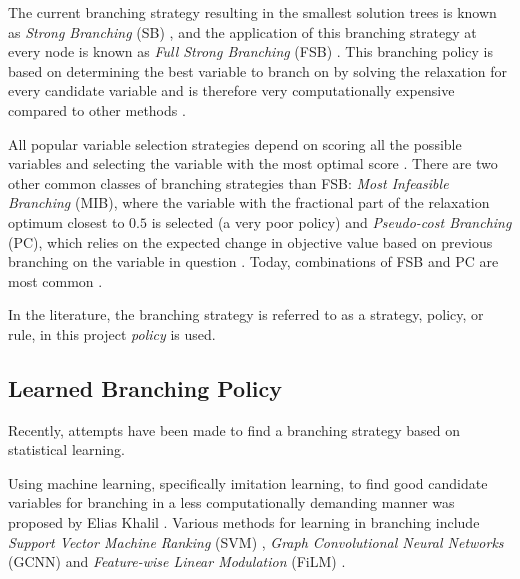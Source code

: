 The current branching strategy resulting in the smallest solution trees is known as \textit{Strong Branching} (\gls{SB}) \cite{applegate1995finding}, and the application of this branching strategy at every node is known as \textit{Full Strong Branching} (\gls{FSB}) \cite{achterberg2004branching}. 
This branching policy is based on determining the best variable to branch on by solving the relaxation for every candidate variable and is therefore very computationally expensive compared to other methods \cite{achterberg2004branching}.

All popular variable selection strategies depend on scoring all the possible variables and selecting the variable with the most optimal score \cite{achterberg2004branching}. There are two other common classes of branching strategies than \gls{FSB}: \textit{Most Infeasible Branching} (\gls{MIB}), where the variable with the fractional part of the relaxation optimum closest to $0.5$ is selected (a very poor policy) 
and \textit{Pseudo-cost Branching} (\gls{PC}), which relies on the expected change in objective value based on previous branching on the variable in question
\cite{achterberg2004branching}. Today, combinations of \gls{FSB} and \gls{PC} are most common \cite{anand2017comparative}.   

In the literature, the branching strategy is referred to as a strategy, policy, or rule, in this project \textit{policy} is used.  








\subsection{Learned Branching Policy}

Recently, attempts have been made to find a branching strategy based on statistical learning. 

Using machine learning, specifically imitation learning, to find good candidate variables for branching in a less computationally demanding manner was proposed by Elias Khalil \cite{khalil2016learning}. Various methods for learning in branching include \textit{ Support Vector Machine Ranking} (\Gls{SVM}) \cite{khalil2016learning}, \textit{Graph Convolutional Neural Networks} (\gls{GCNN}) \cite{gasse2019exact} and \textit{Feature-wise Linear Modulation} (\gls{FiLM}) \cite{gupta2020hybrid}.


